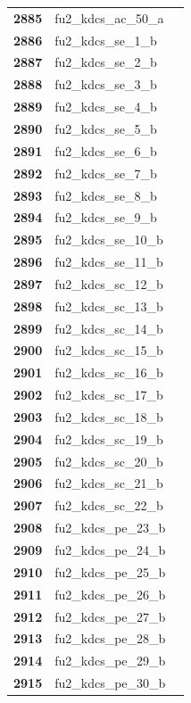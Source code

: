 \documentclass[
  letterpaper,
  DIV=11,
  numbers=noendperiod]{scrartcl}
\begin{document}
\begin{longtable}[t]{>{}cll}
\textbf{2885} & fu2\_kdcs\_ac\_50\_a & \\
\addlinespace
\textbf{2886} & fu2\_kdcs\_se\_1\_b & \\
\textbf{2887} & fu2\_kdcs\_se\_2\_b & \\
\textbf{2888} & fu2\_kdcs\_se\_3\_b & \\
\textbf{2889} & fu2\_kdcs\_se\_4\_b & \\
\textbf{2890} & fu2\_kdcs\_se\_5\_b & \\
\addlinespace
\textbf{2891} & fu2\_kdcs\_se\_6\_b & \\
\textbf{2892} & fu2\_kdcs\_se\_7\_b & \\
\textbf{2893} & fu2\_kdcs\_se\_8\_b & \\
\textbf{2894} & fu2\_kdcs\_se\_9\_b & \\
\textbf{2895} & fu2\_kdcs\_se\_10\_b & \\
\addlinespace
\textbf{2896} & fu2\_kdcs\_se\_11\_b & \\
\textbf{2897} & fu2\_kdcs\_sc\_12\_b & \\
\textbf{2898} & fu2\_kdcs\_sc\_13\_b & \\
\textbf{2899} & fu2\_kdcs\_sc\_14\_b & \\
\textbf{2900} & fu2\_kdcs\_sc\_15\_b & \\
\addlinespace
\textbf{2901} & fu2\_kdcs\_sc\_16\_b & \\
\textbf{2902} & fu2\_kdcs\_sc\_17\_b & \\
\textbf{2903} & fu2\_kdcs\_sc\_18\_b & \\
\textbf{2904} & fu2\_kdcs\_sc\_19\_b & \\
\textbf{2905} & fu2\_kdcs\_sc\_20\_b & \\
\addlinespace
\textbf{2906} & fu2\_kdcs\_sc\_21\_b & \\
\textbf{2907} & fu2\_kdcs\_sc\_22\_b & \\
\textbf{2908} & fu2\_kdcs\_pe\_23\_b & \\
\textbf{2909} & fu2\_kdcs\_pe\_24\_b & \\
\textbf{2910} & fu2\_kdcs\_pe\_25\_b & \\
\addlinespace
\textbf{2911} & fu2\_kdcs\_pe\_26\_b & \\
\textbf{2912} & fu2\_kdcs\_pe\_27\_b & \\
\textbf{2913} & fu2\_kdcs\_pe\_28\_b & \\
\textbf{2914} & fu2\_kdcs\_pe\_29\_b & \\
\textbf{2915} & fu2\_kdcs\_pe\_30\_b & \\

\end{longtable}
\end{document}
